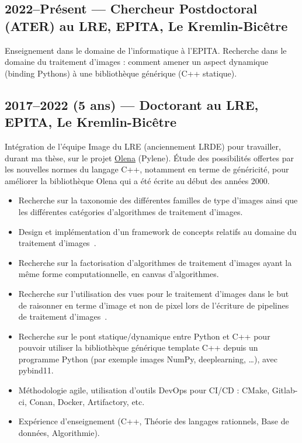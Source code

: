 \documentclass[11pt,a4paper,sans]{article} %
\begin{document}
\subsection{2022--Présent --- Chercheur Postdoctoral (ATER) au LRE, EPITA, Le Kremlin-Bicêtre}

Enseignement dans le domaine de l'informatique à l'EPITA.
Recherche dans le domaine du traitement d'images : comment amener un aspect dynamique (binding Pythons) à une
bibliothèque générique (C++ statique).

\subsection{2017--2022 (5 ans) --- Doctorant au LRE, EPITA, Le Kremlin-Bicêtre}

Intégration de l'équipe Image du LRE (anciennement LRDE) pour travailler, durant ma thèse, sur le projet
\href{https://www.lre.epita.fr/wiki/Olena}{Olena} (Pylene). \'{E}tude des possibilités offertes par les nouvelles normes
du langage C++, notamment en terme de généricité, pour améliorer la bibliothèque Olena qui a été écrite au début des
années 2000.
\begin{itemize}
  \item Recherche sur la taxonomie des différentes familles de type d'images ainsi que les différentes catégories
        d'algorithmes de traitement d'images.
  \item Design et implémentation d'un framework de concepts relatifs au domaine du traitement
        d'images~\parencite{roynard.2019.rrpr}.
  \item Recherche sur la factorisation d'algorithmes de traitement d'images ayant la même forme computationnelle, en
        canvas d'algorithmes.
  \item Recherche sur l'utilisation des vues pour le traitement d'images dans le but de raisonner en terme d'image et
        non de pixel lors de l'écriture de pipelines de traitement d'images~\parencite{roynard.2022.gpce}.
  \item Recherche sur le pont statique/dynamique entre Python et C++ pour pouvoir utiliser la bibliothèque générique
        template C++ depuis un programme Python (par exemple images NumPy, deeplearning, \ldots), avec pybind11.
  \item Méthodologie agile, utilisation d'outils DevOps pour CI/CD : CMake, Gitlab-ci, Conan, Docker, Artifactory, etc.
  \item Expérience d'enseignement (C++, Théorie des langages rationnels, Base de données, Algorithmie).
\end{itemize}
\end{document}
